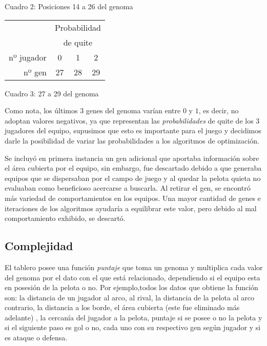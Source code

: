 \vskip 1mm
\begin{center}
{Cuadro 2: Posiciones 14 a 26 del genoma}
\end{center}

\begin{tabular}{r|ccc|}
\cline{2-4}
 & \multicolumn{3}{c|}{Probabilidad} \\
 & \multicolumn{3}{c|}{de quite} \\ \hline
\multicolumn{1}{|r|}{nº jugador} & 0 & 1 & 2 \\ \hline
\multicolumn{1}{|r|}{nº gen} & 27 & 28 & 29 \\ \hline
\end{tabular}

\vskip 1mm
\begin{center}
{Cuadro 3: 27 a 29 del genoma}
\end{center}

Como nota, los últimos 3 genes del genoma varían entre $0$ y $1$, es decir, no
adoptan valores negativos, ya que representan las {\it probabilidades\/} de
quite de los 3 jugadores del equipo, supusimos que esto es importante para el
juego y decidimos darle la posibilidad de variar las probabilidades a los
algoritmos de optimización.

Se incluyó en primera instancia un gen adicional que aportaba información sobre
el área cubierta por el equipo, sin embargo, fue descartado debido a que
generaba equipos que se dispersaban por el campo de juego y al quedar la pelota
quieta no evaluaban como beneficioso acercarse a buscarla. Al retirar el gen,
se encontró más variedad de comportamientos en los equipos. Una mayor cantidad de
genes e iteraciones de los algoritmos ayudaría a equilibrar este valor, pero
debido al mal comportamiento exhibido, se descartó.

\subsection{Complejidad}

El tablero posee una función {\it puntaje\/} que toma un genoma y
multiplica cada valor del genoma por el dato con el que está relacionado,
dependiendo si el equipo esta en posesión de la pelota o no. Por ejemplo,todos
los datos que obtiene la función son:
la distancia de un jugador al arco, al rival, la distancia de la
pelota al arco contrario, la distancia a los borde, el área cubierta (este fue eliminado más adelante)
, la cercanía del jugador a la pelota, puntaje si se posee o no la pelota y si el
siguiente paso es gol o no, cada uno con su respectivo gen según jugador y si es ataque o defensa.

